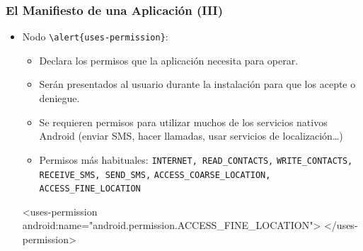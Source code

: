 \documentclass[hyperref={pdfpagelabels=true},ucs]{beamer}
\begin{document}
\begin{frame}[fragile]
\frametitle{El Manifiesto de una Aplicación (III)}  

\begin{itemize}

\item Nodo \Verb|\alert{uses-permission}|:
  \begin{itemize}
  \item Declara los permisos que la aplicación necesita para operar.
  \item Serán presentados al usuario durante la instalación para que
    los acepte o deniegue.
  \item Se requieren permisos para utilizar muchos de los servicios
    nativos Android (enviar SMS, hacer llamadas, usar servicios de
    localización\ldots)
  \item Permisos más habituales:
    \verb|INTERNET, READ_CONTACTS,| \verb|WRITE_CONTACTS,|
    \verb|RECEIVE_SMS, SEND_SMS,| \verb|ACCESS_COARSE_LOCATION,|
    \verb|ACCESS_FINE_LOCATION|
  \end{itemize}

\begin{tiny}
\begin{block}{}
\begin{xml}
<uses-permission android:name="android.permission.ACCESS_FINE_LOCATION">
</uses-permission>
\end{xml}
\end{block}
\end{tiny}

\end{itemize}

\end{frame}
\end{document}
